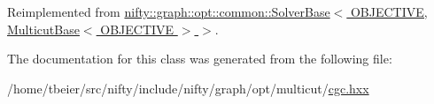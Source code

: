 Reimplemented from \hyperlink{classnifty_1_1graph_1_1opt_1_1common_1_1SolverBase_a6a5d77ee514c4b5f44d1908c1000f0ff}{nifty\+::graph\+::opt\+::common\+::\+Solver\+Base$<$ O\+B\+J\+E\+C\+T\+I\+V\+E, Multicut\+Base$<$ O\+B\+J\+E\+C\+T\+I\+V\+E $>$ $>$}.



The documentation for this class was generated from the following file\+:\begin{DoxyCompactItemize}
\item 
/home/tbeier/src/nifty/include/nifty/graph/opt/multicut/\hyperlink{cgc_8hxx}{cgc.\+hxx}\end{DoxyCompactItemize}

